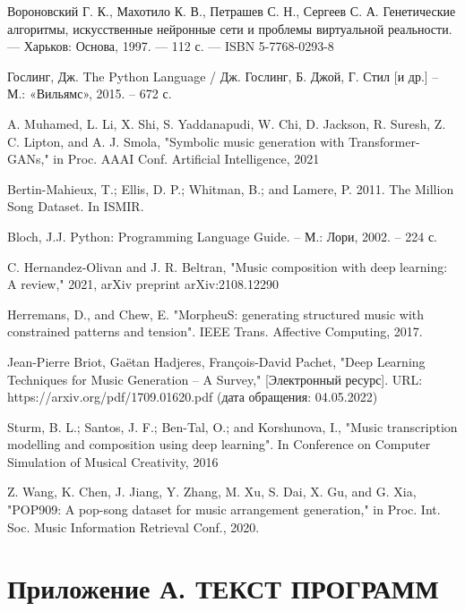 \documentclass{disser}
\begin{document}
\begin{thebibliography}{99}
      Вороновский Г. К., Махотило К. В., Петрашев С. Н., Сергеев С. А.  Генетические алгоритмы, искусственные нейронные сети и проблемы виртуальной реальности. — Харьков: Основа, 1997. — 112 с. — ISBN 5-7768-0293-8
      
      Гослинг, Дж. The Python Language / Дж. Гослинг, Б. Джой, Г. Стил [и др.] – М.: «Вильямс», 2015. – 672 с.
      
      A. Muhamed, L. Li, X. Shi, S. Yaddanapudi, W. Chi, D. Jackson, R. Suresh, Z. C. Lipton, and A. J. Smola, "Symbolic music generation with Transformer-GANs," in Proc. AAAI Conf. Artificial Intelligence, 2021
      
      Bertin-Mahieux, T.; Ellis, D. P.; Whitman, B.; and Lamere, P. 2011. The Million Song Dataset. In ISMIR.
    
      Bloch, J.J. Python: Programming Language Guide. – М.: Лори, 2002. – 224 с.
      
       C. Hernandez-Olivan and J. R. Beltran, "Music composition with deep learning: A review," 2021, arXiv preprint arXiv:2108.12290
       
      Herremans, D., and Chew, E. "MorpheuS: generating structured music with constrained patterns and tension". IEEE Trans. Affective Computing, 2017.
      
      Jean-Pierre Briot, Gaëtan Hadjeres, François-David Pachet,
      "Deep Learning Techniques for Music Generation -- A Survey," [Электронный ресурс]. URL: https://arxiv.org/pdf/1709.01620.pdf (дата обращения: 04.05.2022)
     
      Sturm, B. L.; Santos, J. F.; Ben-Tal, O.; and Korshunova, I., "Music transcription modelling and composition using deep learning". In Conference on Computer Simulation of Musical Creativity, 2016
    
      Z. Wang, K. Chen, J. Jiang, Y. Zhang, M. Xu, S. Dai, X. Gu, and G. Xia, "POP909: A pop-song dataset for music arrangement generation," in
      Proc. Int. Soc. Music Information Retrieval Conf., 2020.
\end{thebibliography}

\appendix
\renewcommand{\thechapter}{\Asbuk{chapter}}
%
\chapter*{Приложение А. ТЕКСТ ПРОГРАММ}
\label{application:a}
    
\end{document}
